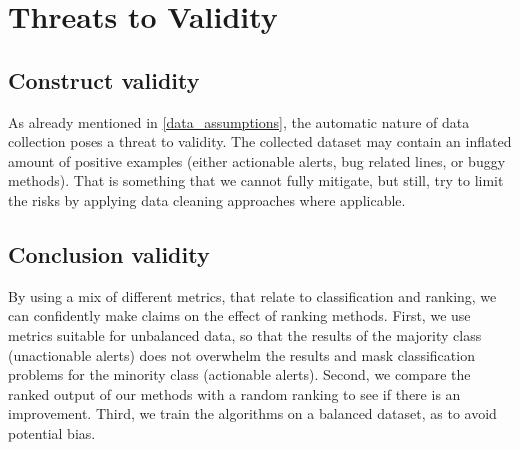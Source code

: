 
\section{Threats to Validity}\label{sec:threats}


\subsection{Construct validity}

As already mentioned in \cref{data_assumptions}, the automatic nature of data collection poses a threat to validity. The collected dataset may contain an inflated amount of positive examples (either actionable alerts, bug related lines, or buggy methods). That is something that we cannot fully mitigate, but still, try to limit the risks by applying data cleaning approaches where applicable.

\subsection{Conclusion validity}

By using a mix of different metrics, that relate to classification and ranking, we can confidently make claims on the effect of ranking methods. 
First, we use metrics suitable for unbalanced data, so that the results of the majority class (unactionable alerts) does not overwhelm the results and mask classification problems for the minority class (actionable alerts). Second, we compare the ranked output of our methods with a random ranking to see if there is an improvement. Third, we train the algorithms on a balanced dataset, as to avoid potential bias.


